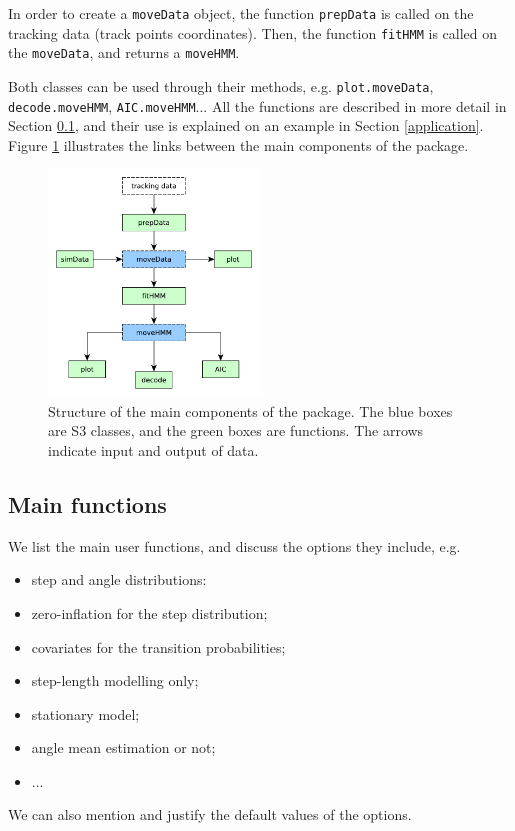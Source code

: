 \documentclass[]{article}
\begin{document}
In order to create a \texttt{moveData} object, the function \texttt{prepData} is called on the tracking data (track points coordinates). Then, the function \texttt{fitHMM} is called on the \texttt{moveData}, and returns a \texttt{moveHMM}.

Both classes can be used through their methods, e.g. \texttt{plot.moveData}, \texttt{decode.moveHMM}, \texttt{AIC.moveHMM}... All the functions are described in more detail in Section \ref{main_functions}, and their use is explained on an example in Section \ref{application}.\\

Figure \ref{struct} illustrates the links between the main components of the package.

\begin{figure}[h]
	\centering
	\includegraphics[width=0.5\textwidth]{pictures/struct}
	\caption{Structure of the main components of the package. The blue boxes are S3 classes, and the green boxes are functions. The arrows indicate input and output of data.}
	\label{struct}
\end{figure}


\subsection{Main functions} \label{main_functions}
We list the main user functions, and discuss the options they include, e.g.
\begin{itemize}
	\item step and angle distributions:
	\item zero-inflation for the step distribution;
	\item covariates for the transition probabilities;
	\item step-length modelling only;
	\item stationary model;
	\item angle mean estimation or not;
	\item ...
\end{itemize}
We can also mention and justify the default values of the options.
\end{document}
